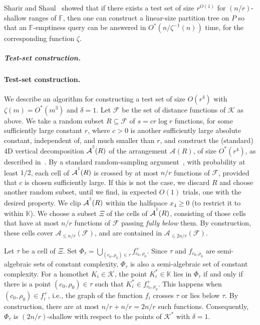 \documentclass[11pt]{article}
\def\Fspace{{\mathbb F}}
\def\Kspace{{\mathbb K}}
\def\A{\mathcal{A}}
\def\F{\mathcal{F}}
\def\K{\mathcal{K}}
\def\cell{\tau}
\def\VeD#1{{#1}^{\mbox{\raisebox{4pt}{\tiny$\|$}}}}
\def\Ak#1{\A_{{\le}#1}}
\theoremstyle{definition}
\begin{document}
\medskip
Sharir and Shaul~\cite{ShSh} showed that if there exists a test set of size $r^{O(1)}$ for $(n/r)$-shallow 
ranges of $\Fspace$, then one can construct a linear-size partition tree on $P$ so that an
$\Fspace$-emptiness query can be answered in $O^*(n/\zeta^{-1}(n))$ time, for the corresponding function $\zeta$. 

\ifsocgproc 
\subparagraph*{Test-set construction.}
\else
\paragraph{Test-set construction.}
\fi
We describe an algorithm for constructing a test set 
of size $O(r^4)$ with $\zeta(m)=O^*(m^3)$ and $\delta=1$.
Let $\F$ be the set of distance functions of $\K$ as above. We take a 
random subset $R\subseteq \F$ of $s = cr\log r$ functions, for some sufficiently large constant $r$, 
where $c>0$ is another sufficiently large absolute constant, independent of, and much smaller than $r$, 
and construct the (standard) 4D
vertical decomposition $\VeD{\A}(R)$ of the arrangement $\A(R)$, of size $O^*(r^4)$, as 
described in~\cite{AES,Koltun-04a,SA}.
By a standard random-sampling argument~\cite{HW87}, with probability at least $1/2$, 
each cell of $\VeD{\A}(R)$ is crossed by at most $n/r$ functions of $\F$, 
provided that $c$ is chosen sufficiently large.
If this is not the case, we discard $R$ and choose another random subset, until we find, in
expected $O(1)$ trials, one with
the desired property. 
We clip $\VeD{\A}(R)$ within the halfspace $x_4\ge 0$ (to restrict it to within $\Kspace$).
We choose a subset $\Xi$ of the cells of $\VeD{\A}(R)$, consisting of those cells that have at most 
$n/r$ functions of $\F$ passing \emph{fully below} them. By construction, these cells cover 
$\Ak{n/r}(\F)$, and are contained in $\Ak{2n/r}(\F)$.

Let $\cell$ be a cell of $\Xi$.
Set $\Phi_\cell = \bigcup_{(c_0,\rho_0)\in\cell} f_{c_0,\rho_0}^+$.
Since $\cell$ and $f_{c_0,\rho_0}$ are semi-algebraic sets of constant complexity, 
$\Phi_\cell$ is also a semi-algebraic set of constant complexity. 
For a homothet $K_i\in \K$, the point $K_i^* \in \Kspace$ lies in $\Phi_\cell$ if and only 
if there is a point $(c_0,\rho_0)\in\cell$ such that $K_i^* \in f_{c_0,\rho_0}^+$. This happens
when $(c_0,\rho_0)\in f_i^+$, i.e., the graph of 
the function $f_i$ crosses $\cell$ or lies below $\cell$.
By construction, there are at most $n/r + n/r = 2n/r$ such functions. 
Consequently, $\Phi_\cell$ is $(2n/r)$-shallow with respect to the points of $\K^*$ with
$\delta = 1$.
\end{document}
